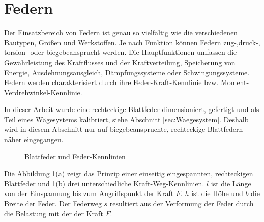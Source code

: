 \newpage
\section{Federn}
\label{sec:Federn}

Der Einsatzbereich von Federn ist genau so vielfältig wie die verschiedenen Bautypen, Größen und Werkstoffen. Je nach Funktion können Federn zug-,druck-, torsion- oder biegebeansprucht werden. 
Die Hauptfunktionen umfassen die Gewährleistung des Kraftflusses und der Kraftverteilung, Speicherung von Energie, Ausdehnungsausgleich, Dämpfungssysteme oder Schwingungssysteme. 
Federn werden charakterisiert durch ihre Feder-Kraft-Kennlinie bzw. Moment-Verdrehwinkel-Kennlinie. 

In dieser Arbeit wurde eine rechteckige Blattfeder dimensioniert, gefertigt und als Teil eines Wägesystems kalibriert, siehe Abschnitt \ref{sec:Waegesystem}. Deshalb wird in diesem Abschnitt nur auf biegebeanspruchte, rechteckige Blattfedern näher eingegangen. 

\begin{figure}[htb]
\centering
{}
\caption{Blattfeder und Feder-Kennlinien \citep{Wittel2011}}
\label{fig:Federdiagramm}
\end{figure}

Die Abbildung \ref{fig:Federdiagramm}(a) zeigt das Prinzip einer einseitig eingespannten, rechteckigen Blattfeder und \ref{fig:Federdiagramm}(b) drei unterschiedliche Kraft-Weg-Kennlinien. $l$ ist die Länge von der Einspannung bis zum Angriffspunkt der Kraft $F$. $h$ ist die Höhe und $b$ die Breite der Feder. Der Federweg $s$ resultiert aus der Verformung der Feder durch die Belastung mit der der Kraft $F$.

